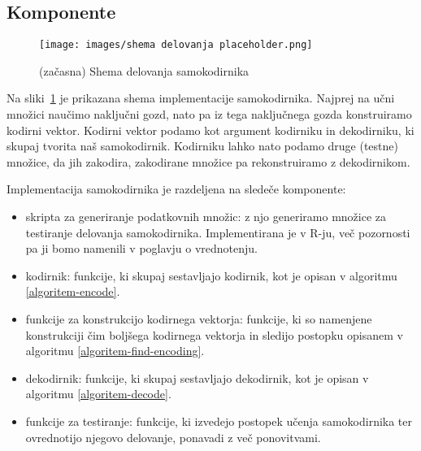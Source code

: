 \documentclass[12pt,a4paper,twoside]{article}
\theoremstyle{definition} %
\theoremstyle{plain} %
\numberwithin{equation}{section}  %
\begin{document}
\subsection{Komponente}

\begin{figure}[h!]

	\begin{center}
	\texttt{[image: images/shema delovanja placeholder.png]}
	\end{center}
	
	\caption{(začasna) Shema delovanja samokodirnika}
	\label{fig:shema_delovanja}
\end{figure}


Na sliki~\ref{fig:shema_delovanja} je prikazana shema implementacije samokodirnika.
Najprej na učni množici naučimo naključni gozd, nato pa iz tega naključnega gozda konstruiramo kodirni vektor.
Kodirni vektor podamo kot argument kodirniku in dekodirniku, ki skupaj tvorita naš samokodirnik.
Kodirniku lahko nato podamo druge (testne) množice, da jih zakodira, zakodirane množice pa rekonstruiramo z dekodirnikom.



Implementacija samokodirnika je razdeljena na sledeče komponente:

\begin{itemize}
	\item skripta za generiranje podatkovnih množic: z njo generiramo množice za testiranje delovanja samokodirnika. 
	Implementirana je v R-ju, več pozornosti pa ji bomo namenili v poglavju o vrednotenju. %

	\item kodirnik: funkcije, ki skupaj sestavljajo kodirnik, kot je opisan v algoritmu \ref{algoritem-encode}.

	\item funkcije za konstrukcijo kodirnega vektorja: 
	funkcije, ki so namenjene konstrukciji čim boljšega kodirnega vektorja in sledijo postopku opisanem v algoritmu \ref{algoritem-find-encoding}.

	\item dekodirnik: funkcije, ki skupaj sestavljajo dekodirnik, kot je opisan v algoritmu \ref{algoritem-decode}.

	\item funkcije za testiranje: funkcije, ki izvedejo postopek učenja samokodirnika ter ovrednotijo njegovo delovanje, ponavadi z več ponovitvami.
\end{itemize}
\end{document}
